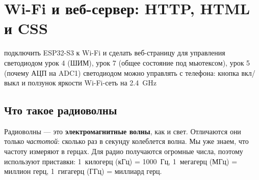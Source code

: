\section{Wi-Fi и веб-сервер: HTTP, HTML и CSS}\label{les:radio}\label{les:web}
\lessonintro
  {подключить ESP32-S3 к Wi-Fi и сделать веб-страницу для управления светодиодом}
  {урок 4 (ШИМ), урок 7 (общее состояние под мьютексом), урок 5 (почему АЦП на ADC1)}
  {светодиодом можно управлять с телефона: кнопка вкл/выкл и ползунок яркости}
  {Wi-Fi-сеть на \SI{2.4}{GHz}}

\subsection{Что такое радиоволны}

Радиоволны --- это \textbf{электромагнитные волны}, как и свет. Отличаются они только
\emph{частотой}: сколько раз в секунду колеблется волна. Мы уже знаем, что частоту измеряют в герцах.
Для радио получаются огромные числа, поэтому используют приставки:
1~килогерц (кГц) = 1000~Гц, 1~мегагерц (МГц) = миллион герц, 1~гигагерц (ГГц) = миллиард герц.

